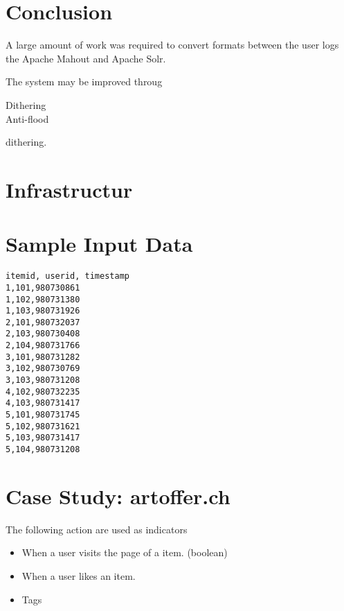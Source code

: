 \documentclass[twoside,a4paper]{article}
\begin{document}
\section{Conclusion}
\label{sec:similarity}

A large amount of work was required to convert formats between the user logs the Apache Mahout and Apache Solr.

The system may be improved throug 
\begin{description}
\item[Dithering] 
\item[Anti-flood] 
\end{description}
dithering.

\section{Infrastructur}
\label{sec:infrastructur}

\appendix

\section{Sample Input Data}
\label{sec:sampleinput}

\begin{verbatim}
itemid, userid, timestamp
1,101,980730861
1,102,980731380
1,103,980731926
2,101,980732037
2,103,980730408
2,104,980731766
3,101,980731282
3,102,980730769
3,103,980731208
4,102,980732235
4,103,980731417
5,101,980731745
5,102,980731621
5,103,980731417
5,104,980731208
\end{verbatim}

\section{Case Study: artoffer.ch}
\label{sec:artoffer}

The following action are used as indicators
\begin{itemize}
\item When a user visits the page of a item. (boolean)
\item When a user likes an item.
\item Tags
\end{itemize}


\end{document}
